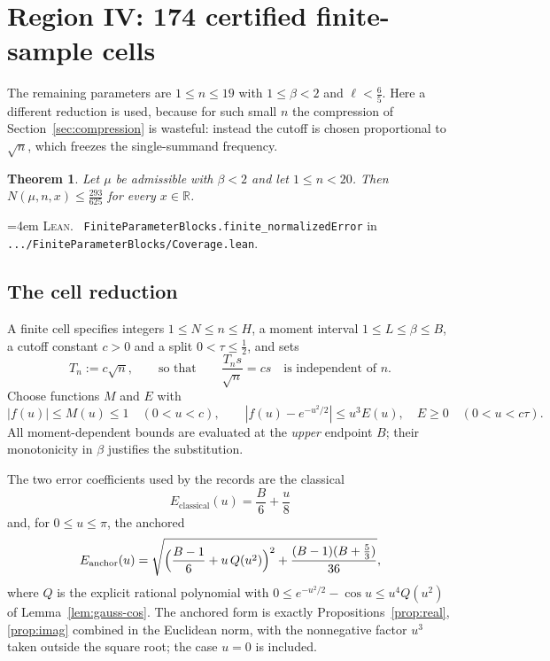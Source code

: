 \documentclass[10pt,a4paper]{article}
\theoremstyle{plain}
\newtheorem{theorem}{Theorem}[section]
\theoremstyle{definition}
\newcommand{\R}{\mathbb{R}}
\newcommand{\lean}[1]{\texttt{#1}}
\newcommand{\file}[1]{\texttt{#1}}
\newenvironment{leanref}%
  {\par\addvspace{3pt}\begingroup\sloppy\emergencystretch=4em
   \noindent\footnotesize\textsc{Lean.}\ \ignorespaces}%
  {\par\endgroup\addvspace{3pt}}
\begin{document}
\section{Region IV: 174 certified finite-sample cells}
\label{sec:finite}

The remaining parameters are $1\le n\le19$ with $1\le\beta<2$ and
$\ell<\tfrac65$. Here a different reduction is used, because for such small $n$
the compression of Section~\ref{sec:compression} is wasteful: instead the cutoff
is chosen proportional to $\sqrt n$, which freezes the single-summand frequency.

\begin{theorem}\label{thm:finite}
Let $\mu$ be admissible with $\beta<2$ and let $1\le n<20$. Then
$N(\mu,n,x)\le\tfrac{293}{625}$ for every $x\in\R$.
\end{theorem}

\begin{leanref}
\lean{FiniteParameterBlocks.finite\_normalizedError} in
\file{.../FiniteParameterBlocks/Coverage.lean}.
\end{leanref}

\subsection{The cell reduction}
\label{sec:finite-bounds}

A finite cell specifies integers $1\le N\le n\le H$, a moment interval
$1\le L\le\beta\le B$, a cutoff constant $c>0$ and a split $0<\tau\le\tfrac12$,
and sets
\[
  T_n := c\sqrt n,
  \qquad\text{so that}\qquad
  \frac{T_n s}{\sqrt n} = cs
  \quad\text{is independent of } n .
\]
Choose functions $M$ and $E$ with
\[
  |f(u)| \le M(u)\le1 \quad (0<u<c),
  \qquad
  |f(u)-e^{-u^2/2}| \le u^3E(u),\quad E\ge0 \quad (0<u<c\tau).
\]
All moment-dependent bounds are evaluated at the \emph{upper} endpoint $B$;
their monotonicity in $\beta$ justifies the substitution.

The two error coefficients used by the records are the classical
\[
  E_{\mathrm{classical}}(u) = \frac B6+\frac u8
\]
and, for $0\le u\le\pi$, the anchored
\[
  E_{\mathrm{anchor}}(u) =
  \sqrt{\Bigl(\frac{B-1}{6}+u\,Q(u^2)\Bigr)^2
    + \frac{(B-1)(B+\tfrac53)}{36}} ,
\]
where $Q$ is the explicit rational polynomial with
$0\le e^{-u^2/2}-\cos u\le u^4Q(u^2)$ of Lemma~\ref{lem:gauss-cos}. The
anchored form is exactly Propositions~\ref{prop:real}, \ref{prop:imag}
combined in the Euclidean norm, with the nonnegative factor $u^3$ taken outside
the square root; the case $u=0$ is included.
\end{document}
